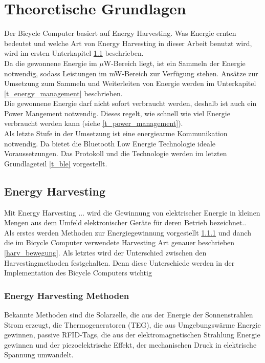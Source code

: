 \chapter{Theoretische Grundlagen}
Der Bicycle Computer basiert auf Energy Harvesting. Was Energie ernten bedeutet und welche Art von Energy Harvesting in dieser Arbeit benutzt wird, wird im ersten Unterkapitel \ref{t_harvesting} beschrieben. \\
Da die gewonnene Energie im $\mu$W-Bereich liegt, ist ein Sammeln der Energie notwendig, sodass Leistungen im mW-Bereich zur Verfügung stehen. Ansätze zur Umsetzung zum Sammeln und Weiterleiten von Energie werden im Unterkapitel \ref{t_energy_management} beschrieben.\\ 
Die gewonnene Energie darf nicht sofort verbraucht werden, deshalb ist auch ein Power Mangement notwendig. Dieses regelt, wie schnell wie viel Energie verbraucht werden kann (siehe \ref{t_power_management}).\\
Als letzte Stufe in der Umsetzung ist eine energiearme Kommunikation notwendig. Da bietet die Bluetooth Low Energie Technologie ideale Voraussetzungen. Das Protokoll und die Technologie werden im letzten Grundlageteil \ref{t_ble} vorgestellt.


\section{Energy Harvesting}\label{t_harvesting} 

\glqq Mit Energy Harvesting ... wird die Gewinnung von elektrischer Energie in kleinen Mengen aus dem Umfeld elektronischer Geräte für deren Betrieb bezeichnet.\grqq \cite{harvesting}. \\

Als erstes werden Methoden zur Energiegewinnung vorgestellt \ref{harv_arten} und danch die im Bicycle Computer verwendete Harvesting Art genauer beschrieben \ref{harv_bewegung}. Als letztes wird der Unterschied zwischen den Harvestingmethoden festgehalten. Denn diese Unterschiede werden in der Implementation des Bicycle Computers wichtig


\subsection{Energy Harvesting Methoden}\label{harv_arten} 

Bekannte Methoden sind die Solarzelle, die aus der Energie der Sonnenstrahlen Strom erzeugt, die Thermogeneratoren (TEG), die aus Umgebungswärme Energie gewinnen,  passive RFID-Tags, die aus der elektromagnetischen Strahlung Energie gewinnen und der piezoelektrische Effekt, der mechanischen Druck in elektrische Spannung umwandelt.\\


